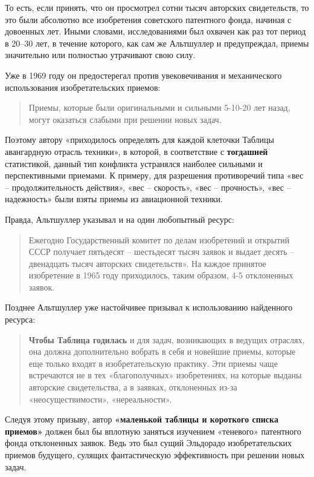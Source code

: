 \documentclass[11pt,a4paper]{article}
\begin{document}
То есть, если принять, что он просмотрел сотни тысяч авторских свидетельств,
то это были абсолютно все изобретения советского патентного фонда, начиная с
довоенных лет. Иными словами, исследованиями был охвачен как раз тот период в
20--30 лет, в течение которого, как сам же Альтшуллер и предупреждал, приемы
значительно или полностью утрачивают свою силу.

Уже в 1969 году он предостерегал против увековечивания и механического
использования изобретательских приемов:
\begin{quote}
  Приемы, которые были оригинальными и сильными 5-10-20 лет назад, могут
  оказаться слабыми при решении новых задач.  \cite[стр. 139]{Altshuller1973}
\end{quote}
Поэтому автору «приходилось определять для каждой клеточки Таблицы авангардную
отрасль техники», в которой, в соответствие с \textbf{тогдашней} статистикой,
данный тип конфликта устранялся наиболее сильными и перспективными приемами. К
примеру, для разрешения противоречий типа «вес -- продолжительность действия»,
«вес -- скорость», «вес -- прочность», «вес -- надежность» были взяты приемы
из авиационной техники.

Правда, Альтшуллер указывал и на один любопытный ресурс:
\begin{quote}
  Ежегодно Государственный комитет по делам изобретений и открытий СССР
  получает пятьдесят -- шестьдесят тысяч заявок и выдает десять -- двенадцать
  тысяч авторских свидетельств». На каждое принятое изобретение в 1965 году
  приходилось, таким образом, 4-5 отклоненных заявок.  \cite{Altshuller1965}
\end{quote}
Позднее Альтшуллер уже настойчивее призывал к использованию найденного ресурса:
\begin{quote}
  \textbf{Чтобы Таблица годилась} и для задач, возникающих в ведущих отраслях,
  она должна дополнительно вобрать в себя и новейшие приемы, которые еще
  только входят в изобретательскую практику. Эти приемы чаще встречаются не в
  тех «благополучных» изобретениях, на которые выданы авторские свидетельства,
  а в заявках, отклоненных из-за «неосуществимости», «нереальности».
  \cite{Altshuller1973} 
\end{quote}
Следуя этому призыву, автор \textbf{«маленькой таблицы и короткого списка
  приемов»} \cite[с. 97]{Altshuller1979} должен был бы вплотную заняться
изучением «теневого» патентного фонда отклоненных заявок. Ведь это был сущий
Эльдорадо изобретательских приемов будущего, сулящих фантастическую
эффективность при решении новых задач.
\end{document}
